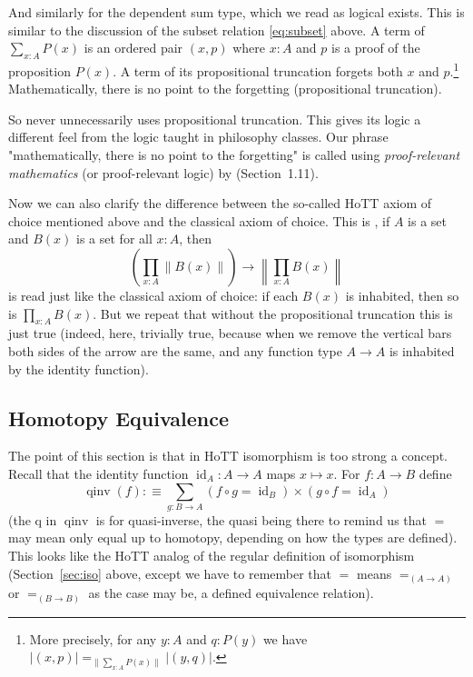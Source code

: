 \documentclass[11pt]{article}
\DeclareMathOperator{\idfun}{id}
\DeclareMathOperator{\qinv}{qinv}
\newcommand{\proptrunc}[1]{\lVert #1 \rVert}
\newcommand{\termtrunc}[1]{\lvert #1 \rvert}
\newcommand{\bigproptrunc}[1]{\left\lVert #1 \right\rVert}
\begin{document}
And similarly for the dependent sum type, which we read as logical exists.
This is similar to the discussion of the subset relation \eqref{eq:subset}
above.
A term of $\sum_{x : A} P(x)$ is an ordered pair $(x, p)$ where
$x : A$ and $p$ is a proof of the proposition $P(x)$.  A term of its
propositional truncation forgets both $x$ and $p$.\footnote{More precisely,
for any $y : A$ and $q : P(y)$ we have $\termtrunc{(x, p)}
=_{\proptrunc{\sum_{x : A} P(x)}} \termtrunc{(y, q)}$.}
Mathematically, there is no point to the forgetting (propositional truncation).

So  never unnecessarily uses propositional truncation.
This gives its logic a different feel from the logic taught in philosophy
classes.
Our phrase "mathematically, there is no point to the forgetting" is called
using \emph{proof-relevant mathematics} (or proof-relevant logic) by
 (Section~1.11).

Now we can also clarify the difference between the so-called HoTT axiom
of choice mentioned above and the classical axiom of choice.  This is
, if $A$ is a set and $B(x)$ is a set
for all $x : A$, then
$$
   \left( \prod_{x : A} \bigproptrunc{B(x)} \right) \to 
   \bigproptrunc{\prod_{x : A} B(x)}
$$
is read just like the classical axiom of choice: if each $B(x)$
is inhabited, then so is $\prod_{x : A} B(x)$.
But we repeat that without the propositional truncation this is just true
(indeed, here, trivially true, because when we remove the vertical bars
both sides of the arrow are the same, and any function type $A \to A$ is
inhabited by the identity function).

\subsection{Homotopy Equivalence}
\label{sec:homotopy-equivalence}

The point of this section is that in HoTT isomorphism is too strong a concept.
Recall that the identity function $\idfun_A : A \to A$ maps $x \mapsto x$.
For $f : A \to B$ define
$$
   \qinv(f) :\equiv \sum_{g : B \to A}
   (f \circ g = \idfun_B) \times (g \circ f = \idfun_A)
$$
(the q in $\qinv$ is for quasi-inverse, the quasi being there to remind us
that $=$ may mean only equal up to homotopy, depending on how the types
are defined).
This looks like the HoTT analog of the regular definition of isomorphism
(Section~\ref{sec:iso} above, except
we have to remember that $=$ means $=_{(A \to A)}$ or $=_{(B \to B)}$
as the case may be, a defined equivalence relation).
\end{document}
